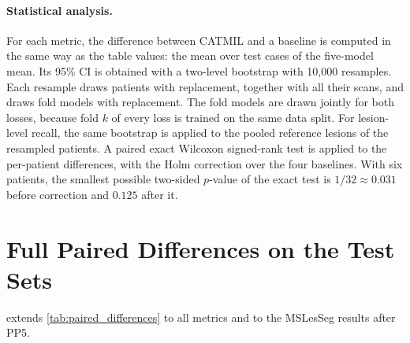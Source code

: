 \paragraph{Statistical analysis.}
\label{appendix:stats}
For each metric, the difference between CATMIL and a baseline is computed
in the same way as the table values: the mean over test cases of the
five-model mean. Its 95\% CI is obtained with a two-level bootstrap with
10{,}000 resamples. Each resample draws patients with replacement, together
with all their scans, and draws fold models with replacement. The fold
models are drawn jointly for both losses, because fold $k$ of every loss is
trained on the same data split. For lesion-level recall, the same bootstrap
is applied to the pooled reference lesions of the resampled patients. A
paired exact Wilcoxon signed-rank test is applied to the per-patient
differences, with the Holm correction over the four baselines. With six
patients, the smallest possible two-sided $p$-value of the exact test is
$1/32 \approx 0.031$ before correction and $0.125$ after it.

\section{Full Paired Differences on the Test Sets}
\label{appendix:paired-full}

 extends \cref{tab:paired_differences}
to all metrics and to the MSLesSeg results after PP5.

